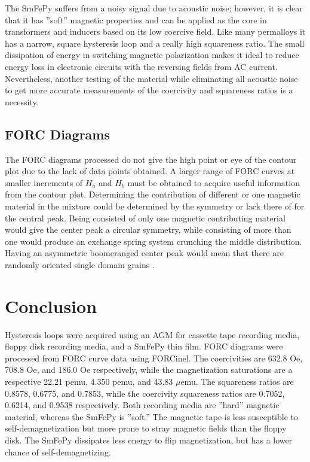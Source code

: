 \documentclass[aps,twocolumn,groupedaddress]{revtex4}
\begin{document}
The SmFePy suffers from a noisy signal due to acoustic noise; however, it is clear that it has ''soft'' magnetic properties and can be applied as the core in transformers and inducers based on its low coercive field. Like many permalloys it has a narrow, square hysteresis loop and a really high squareness ratio. The small dissipation of energy in switching magnetic polarization makes it ideal to reduce energy loss in electronic circuits with the reversing fields from AC current. Nevertheless, another testing of the material while eliminating all acoustic noise to get more accurate measurements of the coercivity and squareness ratios is a necessity.

\subsection{FORC Diagrams}
The FORC diagrams processed do not give the high point or eye of the contour plot due to the lack of data points obtained. A larger range of FORC curves at smaller increments of $H_a$ and $H_b$ must be obtained to acquire useful information from the contour plot. Determining the contribution of different or one magnetic material in the mixture could be determined by the symmetry or lack there of for the central peak. Being consisted of only one magnetic contributing material would give the center peak a circular symmetry, while consisting of more than one would produce an exchange spring system crunching the middle distribution. Having an asymmetric boomeranged center peak would mean that there are randomly oriented single domain grains \cite{MUXWORTHY}.

\section{Conclusion}
Hysteresis loops were acquired using an AGM for cassette tape recording media, floppy disk recording media, and a SmFePy thin film. FORC diagrams were processed from FORC curve data using FORCinel. The coercivities are 632.8 Oe, 708.8 Oe, and 186.0 Oe respectively, while the magnetization saturations are a respective 22.21 pemu, 4.350 pemu, and 43.83 $\mu$emu. The squareness ratios are 0.8578, 0.6775, and 0.7853, while the coercivity squareness ratios are 0.7052, 0.6214, and 0.9538 respectively. Both recording media are ''hard'' magnetic material, whereas the SmFePy is ''soft.'' The magnetic tape is less susceptible to self-demagnetization but more prone to stray magnetic fields than the floppy disk. The SmFePy dissipates less energy to flip magnetization, but has a lower chance of self-demagnetizing.
\end{document}
